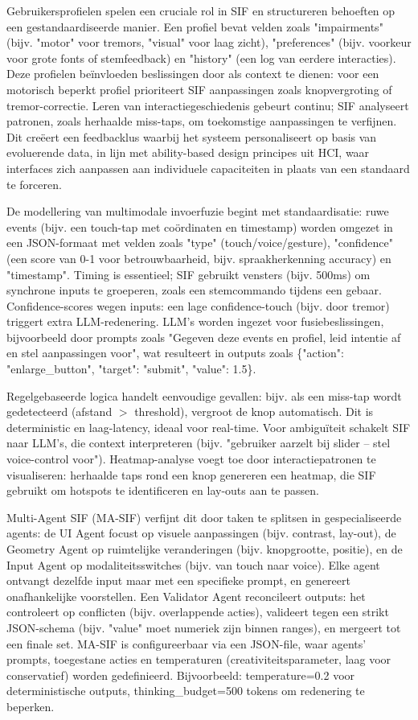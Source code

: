 \documentclass[openany]{book}
\begin{document}
Gebruikersprofielen spelen een cruciale rol in SIF en structureren behoeften op een gestandaardiseerde manier. Een profiel bevat velden zoals "impairments" (bijv. "motor" voor tremors, "visual" voor laag zicht), "preferences" (bijv. voorkeur voor grote fonts of stemfeedback) en "history" (een log van eerdere interacties). Deze profielen beïnvloeden beslissingen door als context te dienen: voor een motorisch beperkt profiel prioriteert SIF aanpassingen zoals knopvergroting of tremor-correctie. Leren van interactiegeschiedenis gebeurt continu; SIF analyseert patronen, zoals herhaalde miss-taps, om toekomstige aanpassingen te verfijnen. Dit creëert een feedbacklus waarbij het systeem personaliseert op basis van evoluerende data, in lijn met ability-based design principes uit HCI, waar interfaces zich aanpassen aan individuele capaciteiten in plaats van een standaard te forceren.

De modellering van multimodale invoerfuzie begint met standaardisatie: ruwe events (bijv. een touch-tap met coördinaten en timestamp) worden omgezet in een JSON-formaat met velden zoals "type" (touch/voice/gesture), "confidence" (een score van 0-1 voor betrouwbaarheid, bijv. spraakherkenning accuracy) en "timestamp". Timing is essentieel; SIF gebruikt vensters (bijv. 500ms) om synchrone inputs te groeperen, zoals een stemcommando tijdens een gebaar. Confidence-scores wegen inputs: een lage confidence-touch (bijv. door tremor) triggert extra LLM-redenering. LLM's worden ingezet voor fusiebeslissingen, bijvoorbeeld door prompts zoals "Gegeven deze events en profiel, leid intentie af en stel aanpassingen voor", wat resulteert in outputs zoals \{"action": "enlarge\_button", "target": "submit", "value": 1.5\}.

Regelgebaseerde logica handelt eenvoudige gevallen: bijv. als een miss-tap wordt gedetecteerd (afstand $>$ threshold), vergroot de knop automatisch. Dit is deterministic en laag-latency, ideaal voor real-time. Voor ambiguïteit schakelt SIF naar LLM's, die context interpreteren (bijv. "gebruiker aarzelt bij slider – stel voice-control voor"). Heatmap-analyse voegt toe door interactiepatronen te visualiseren: herhaalde taps rond een knop genereren een heatmap, die SIF gebruikt om hotspots te identificeren en lay-outs aan te passen.

Multi-Agent SIF (MA-SIF) verfijnt dit door taken te splitsen in gespecialiseerde agents: de UI Agent focust op visuele aanpassingen (bijv. contrast, lay-out), de Geometry Agent op ruimtelijke veranderingen (bijv. knopgrootte, positie), en de Input Agent op modaliteitsswitches (bijv. van touch naar voice). Elke agent ontvangt dezelfde input maar met een specifieke prompt, en genereert onafhankelijke voorstellen. Een Validator Agent reconcileert outputs: het controleert op conflicten (bijv. overlappende acties), valideert tegen een strikt JSON-schema (bijv. "value" moet numeriek zijn binnen ranges), en mergeert tot een finale set. MA-SIF is configureerbaar via een JSON-file, waar agents' prompts, toegestane acties en temperaturen (creativiteitsparameter, laag voor conservatief) worden gedefinieerd. Bijvoorbeeld: temperature=0.2 voor deterministische outputs, thinking\_budget=500 tokens om redenering te beperken.
\end{document}
